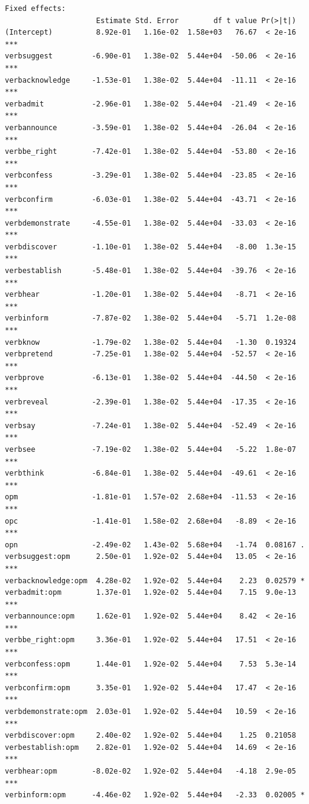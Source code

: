 \documentclass[10pt]{article}\usepackage[]{graphicx}\usepackage[dvipsnames]{xcolor}
\makeatletter
\newenvironment{kframe}{%
 \def\at@end@of@kframe{}%
 \ifinner\ifhmode%
  \def\at@end@of@kframe{\end{minipage}}%
  \begin{minipage}{\columnwidth}%
 \fi\fi%
 \def\FrameCommand##1{\hskip\@totalleftmargin \hskip-\fboxsep
 \colorbox{shadecolor}{##1}\hskip-\fboxsep
     \hskip-\linewidth \hskip-\@totalleftmargin \hskip\columnwidth}%
 \MakeFramed {\advance\hsize-\width
   \@totalleftmargin\z@ \linewidth\hsize
   \@setminipage}}%
 {\par\unskip\endMakeFramed%
 \at@end@of@kframe}
\newenvironment{knitrout}{}{} %
\makeatother
\begin{document}
\begin{knitrout}
\begin{kframe}
\begin{verbatim}
Fixed effects:
                     Estimate Std. Error        df t value Pr(>|t|)    
(Intercept)          8.92e-01   1.16e-02  1.58e+03   76.67  < 2e-16 ***
verbsuggest         -6.90e-01   1.38e-02  5.44e+04  -50.06  < 2e-16 ***
verbacknowledge     -1.53e-01   1.38e-02  5.44e+04  -11.11  < 2e-16 ***
verbadmit           -2.96e-01   1.38e-02  5.44e+04  -21.49  < 2e-16 ***
verbannounce        -3.59e-01   1.38e-02  5.44e+04  -26.04  < 2e-16 ***
verbbe_right        -7.42e-01   1.38e-02  5.44e+04  -53.80  < 2e-16 ***
verbconfess         -3.29e-01   1.38e-02  5.44e+04  -23.85  < 2e-16 ***
verbconfirm         -6.03e-01   1.38e-02  5.44e+04  -43.71  < 2e-16 ***
verbdemonstrate     -4.55e-01   1.38e-02  5.44e+04  -33.03  < 2e-16 ***
verbdiscover        -1.10e-01   1.38e-02  5.44e+04   -8.00  1.3e-15 ***
verbestablish       -5.48e-01   1.38e-02  5.44e+04  -39.76  < 2e-16 ***
verbhear            -1.20e-01   1.38e-02  5.44e+04   -8.71  < 2e-16 ***
verbinform          -7.87e-02   1.38e-02  5.44e+04   -5.71  1.2e-08 ***
verbknow            -1.79e-02   1.38e-02  5.44e+04   -1.30  0.19324    
verbpretend         -7.25e-01   1.38e-02  5.44e+04  -52.57  < 2e-16 ***
verbprove           -6.13e-01   1.38e-02  5.44e+04  -44.50  < 2e-16 ***
verbreveal          -2.39e-01   1.38e-02  5.44e+04  -17.35  < 2e-16 ***
verbsay             -7.24e-01   1.38e-02  5.44e+04  -52.49  < 2e-16 ***
verbsee             -7.19e-02   1.38e-02  5.44e+04   -5.22  1.8e-07 ***
verbthink           -6.84e-01   1.38e-02  5.44e+04  -49.61  < 2e-16 ***
opm                 -1.81e-01   1.57e-02  2.68e+04  -11.53  < 2e-16 ***
opc                 -1.41e-01   1.58e-02  2.68e+04   -8.89  < 2e-16 ***
opn                 -2.49e-02   1.43e-02  5.68e+04   -1.74  0.08167 .  
verbsuggest:opm      2.50e-01   1.92e-02  5.44e+04   13.05  < 2e-16 ***
verbacknowledge:opm  4.28e-02   1.92e-02  5.44e+04    2.23  0.02579 *  
verbadmit:opm        1.37e-01   1.92e-02  5.44e+04    7.15  9.0e-13 ***
verbannounce:opm     1.62e-01   1.92e-02  5.44e+04    8.42  < 2e-16 ***
verbbe_right:opm     3.36e-01   1.92e-02  5.44e+04   17.51  < 2e-16 ***
verbconfess:opm      1.44e-01   1.92e-02  5.44e+04    7.53  5.3e-14 ***
verbconfirm:opm      3.35e-01   1.92e-02  5.44e+04   17.47  < 2e-16 ***
verbdemonstrate:opm  2.03e-01   1.92e-02  5.44e+04   10.59  < 2e-16 ***
verbdiscover:opm     2.40e-02   1.92e-02  5.44e+04    1.25  0.21058    
verbestablish:opm    2.82e-01   1.92e-02  5.44e+04   14.69  < 2e-16 ***
verbhear:opm        -8.02e-02   1.92e-02  5.44e+04   -4.18  2.9e-05 ***
verbinform:opm      -4.46e-02   1.92e-02  5.44e+04   -2.33  0.02005 *  

\end{verbatim}
\end{kframe}
\end{knitrout}
\end{document}
